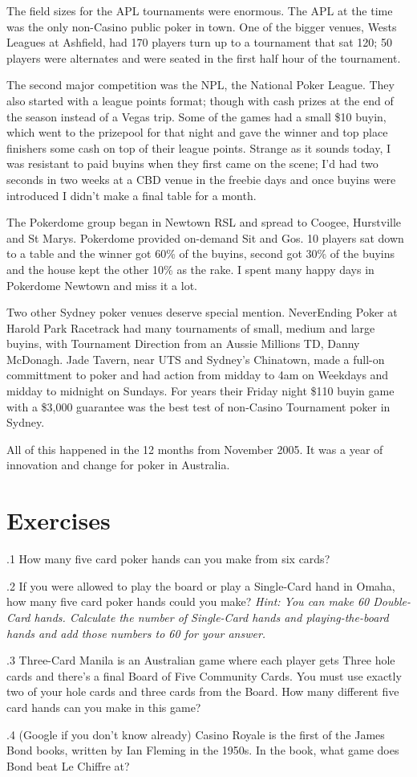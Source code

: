 The field sizes for the APL tournaments were enormous. The APL at the
time was the only non-Casino public poker in town. One of the bigger
venues, Wests Leagues at Ashfield, had 170 players turn up to a
tournament that sat 120; 50 players were alternates and were seated in
the first half hour of the tournament.

The second major competition was the NPL, the National Poker
League. They also started with a league points format; though with
cash prizes at the end of the season instead of a Vegas trip. Some of
the games had a small \$10 buyin, which went to the prizepool for that
night and gave the winner and top place finishers some cash on top of
their league points. Strange as it sounds today, I was resistant to
paid buyins when they first came on the scene; I'd had two seconds in
two weeks at a CBD venue in the freebie days and once buyins were
introduced I didn't make a final table for a month.


The Pokerdome group began in Newtown RSL and spread to Coogee,
Hurstville and St Marys. Pokerdome provided on-demand Sit and Gos.
10 players sat down to a table and the winner got 60\% of the buyins,
second got 30\% of the buyins and the house kept the other 10\% as the
rake. I spent many happy days in Pokerdome Newtown and miss it a lot.

Two other Sydney poker venues deserve special mention. NeverEnding
Poker at Harold Park Racetrack had many tournaments of small, medium
and large buyins, with Tournament Direction from an Aussie Millions
TD, Danny McDonagh. Jade Tavern, near UTS and Sydney's Chinatown, made
a full-on committment to poker and had action from midday to 4am on
Weekdays and midday to midnight on Sundays. For years their Friday
night \$110 buyin game with a \$3,000 guarantee was the best test of
non-Casino Tournament poker in Sydney.

All of this happened in the 12 months from November 2005. It was a
year of innovation and change for poker in Australia.


\section{Exercises}

.1 How many five card poker hands can you make from
six cards?

.2 If you were allowed to play the board or play a
Single-Card hand in Omaha, how many five card poker hands could you
make? \textit{Hint: You can make 60 Double-Card hands. Calculate the
number of Single-Card hands and playing-the-board hands and add those
numbers to 60 for your answer.}

.3 Three-Card Manila is an Australian game where each
player gets Three hole cards and there's a final Board of Five
Community Cards. You must use exactly two of your hole cards and three
cards from the Board. How many different five card hands can you make
in this game?

.4 (Google if you don't know already) Casino Royale
is the first of the James Bond books, written by Ian Fleming in the
1950s. In the book, what game does Bond beat Le Chiffre at?
